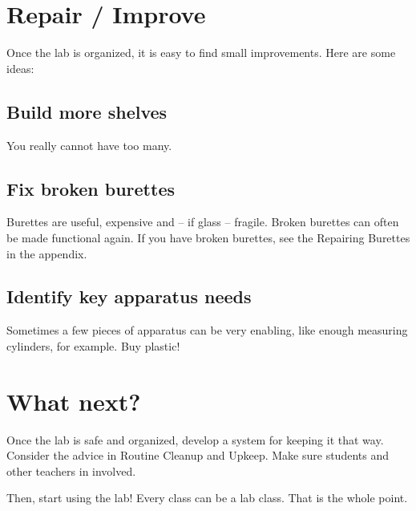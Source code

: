 \section{Repair / Improve}

Once the lab is organized, 
it is easy to find small improvements. 
Here are some ideas:

\subsection{Build more shelves}
You really cannot have too many.

\subsection{Fix broken burettes}
Burettes are useful, 
expensive and – if glass – fragile. 
Broken burettes can often be made functional again. 
If you have broken burettes, 
see the Repairing Burettes in the appendix.

\subsection{Identify key apparatus needs}
Sometimes a few pieces of apparatus can be very enabling, 
like enough measuring cylinders, 
for example. 
Buy plastic!

\section{What next?}

Once the lab is safe and organized, 
develop a system for keeping it that way. 
Consider the advice in Routine Cleanup and Upkeep. 
Make sure students and other teachers in involved.

Then, 
start using the lab! Every class can be a lab class. 
That is the whole point.
